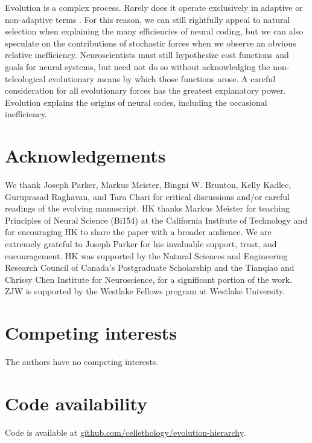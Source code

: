 \documentclass[twocolumn]{article}
\begin{document}
Evolution is a complex process. Rarely does it operate exclusively in adaptive or non-adaptive terms \cite{Gould_Lewontin_1979}. For this reason, we can still rightfully appeal to natural selection when explaining the many efficiencies of neural coding, but we can also speculate on the contributions of stochastic forces when we observe an obvious relative inefficiency. Neuroscientists must still hypothesize cost functions and goals for neural systems, but need not do so without acknowledging the non-teleological evolutionary means by which those functions arose. A careful consideration for all evolutionary forces has the greatest explanatory power. Evolution explains the origins of neural codes, including the occasional inefficiency. 

\newpage
\section*{Acknowledgements}
We thank Joseph Parker, Markus Meister, Bingni W. Brunton, Kelly Kadlec, Guruprasad Raghavan, and Tara Chari for critical discussions and/or careful readings of the evolving manuscript. HK thanks Markus Meister for teaching Principles of Neural Science (Bi154) at the California Institute of Technology and for encouraging HK to share the paper with a broader audience. We are extremely grateful to Joseph Parker for his invaluable support, trust, and encouragement. HK was supported by the Natural Sciences and Engineering Research Council of Canada's Postgraduate Scholarship and the Tianqiao and Chrissy Chen Institute for Neuroscience, for a significant portion of the work. ZJW is supported by the Westlake Fellows program at Westlake University.

\section*{Competing interests}
The authors have no competing interests.

\section*{Code availability}
Code is available at \url{github.com/cellethology/evolution-hierarchy}. 

\newpage
 




\end{document}
